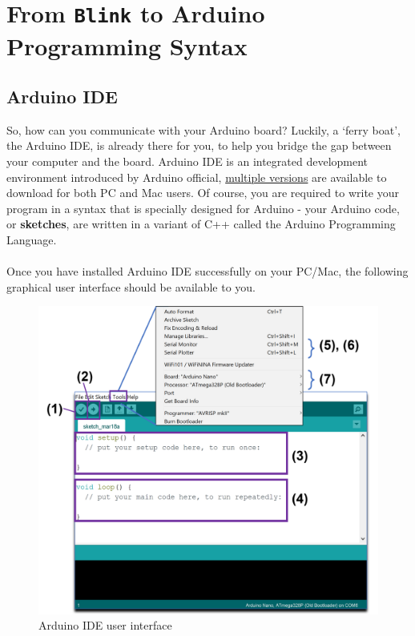 \documentclass{article}
\begin{document}
\newpage
\section{From \texttt{Blink} to Arduino Programming Syntax}
\subsection{Arduino IDE}
So, how can you communicate with your Arduino board? Luckily, a `ferry boat', the Arduino IDE, is already there for you, to help you bridge the gap between your computer and the board. Arduino IDE is an integrated development environment introduced by Arduino official, \href{https://www.arduino.cc/en/software}{multiple versions} are available to download for both PC and Mac users. Of course, you are required to write your program in a syntax that is specially designed for Arduino - your Arduino code, or \textbf{sketches}, are written in a variant of C++ called the Arduino Programming Language.\\\\
Once you have installed Arduino IDE successfully on your PC/Mac, the following graphical user interface should be available to you. 
\begin{figure}[H]
    \centering
    \includegraphics[width=.65\textwidth]{arduino_ide.png}
    \caption{Arduino IDE user interface}
    \label{fig:ide}
\end{figure}
\end{document}
